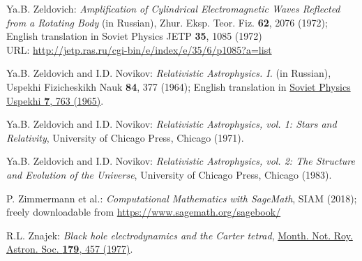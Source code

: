 \begin{thebibliography}{123}
Ya.B. Zeldovich:
{\em Amplification of Cylindrical Electromagnetic Waves Reflected from a Rotating Body} (in Russian),
Zhur. Eksp. Teor. Fiz. {\bf 62}, 2076 (1972); English translation in
Soviet Physics JETP {\bf 35}, 1085 (1972)\\
URL: \url{http://jetp.ras.ru/cgi-bin/e/index/e/35/6/p1085?a=list}

Ya.B. Zeldovich and I.D. Novikov:
{\em Relativistic Astrophysics. I.} (in Russian),
Uspekhi Fizicheskikh Nauk {\bf 84}, 377 (1964);
English translation in \href{https://doi.org/10.1070/PU1965v007n06ABEH003683}{Soviet Physics Uspekhi {\bf 7}, 763 (1965)}.

Ya.B. Zeldovich and I.D. Novikov:
{\em Relativistic Astrophysics, vol. 1: Stars and Relativity},
University of Chicago Press, Chicago (1971).

Ya.B. Zeldovich and I.D. Novikov:
{\em Relativistic Astrophysics, vol. 2: The Structure and Evolution of the Universe},
University of Chicago Press, Chicago (1983).

P. Zimmermann et al.: {\em Computational Mathematics with SageMath}, SIAM (2018);
freely downloadable from \url{https://www.sagemath.org/sagebook/}

R.L. Znajek:
{\em Black hole electrodynamics and the Carter tetrad},
\href{https://doi.org/10.1093/mnras/179.3.457}{Month. Not. Roy. Astron. Soc. {\bf 179}, 457 (1977)}.

\end{thebibliography}
